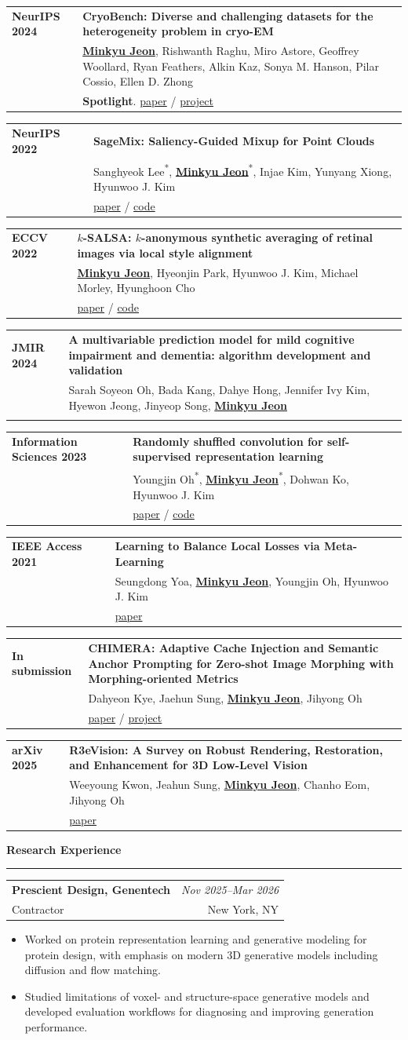 \documentclass[10pt,letterpaper]{article}
\makeatletter
\newcommand{\minkyu}{\underline{\textbf{Minkyu Jeon}}}
\newcommand{\cofirst}{\textsuperscript{*}}
\newcommand{\cvsection}[1]{%
  \vspace{8pt}
  {\large\bfseries\color{accent} #1}\par
  \vspace{2pt}\hrule\vspace{5pt}
}
\newcommand{\entry}[4]{%
  \begin{tabularx}{\textwidth}{@{}>{\raggedright\arraybackslash}X r@{}}
    \textbf{#1} & \textit{#2}\\
    #3 & #4
  \end{tabularx}\vspace{2pt}
}
\newcommand{\paper}[4]{%
  \begin{tabularx}{\textwidth}{@{}p{2.45cm}>{\raggedright\arraybackslash}X@{}}
    \textbf{#1} & \textbf{#2}\\
    & #3\\
    & {\small #4}
  \end{tabularx}\vspace{4pt}
}
\newcommand{\compactitem}[1]{\begin{itemize}#1\end{itemize}\vspace{1pt}}
\makeatother
\begin{document}
\paper{NeurIPS 2024}{CryoBench: Diverse and challenging datasets for the heterogeneity problem in cryo-EM}
{\minkyu, Rishwanth Raghu, Miro Astore, Geoffrey Woollard, Ryan Feathers, Alkin Kaz, Sonya M. Hanson, Pilar Cossio, Ellen D. Zhong}
{\textbf{Spotlight}. \href{https://arxiv.org/pdf/2408.05526}{paper} / \href{https://cryobench.cs.princeton.edu/}{project}}

\paper{NeurIPS 2022}{SageMix: Saliency-Guided Mixup for Point Clouds}
{Sanghyeok Lee\cofirst, \minkyu\cofirst, Injae Kim, Yunyang Xiong, Hyunwoo J. Kim}
{\href{https://openreview.net/pdf?id=q-FRENiEP_d}{paper} / \href{https://github.com/mlvlab/SageMix/}{code}}

\paper{ECCV 2022}{$k$-SALSA: $k$-anonymous synthetic averaging of retinal images via local style alignment}
{\minkyu, Hyeonjin Park, Hyunwoo J. Kim, Michael Morley, Hyunghoon Cho}
{\href{https://arxiv.org/pdf/2303.10824}{paper} / \href{https://github.com/hcholab/k-salsa/}{code}}

\paper{JMIR 2024}{A multivariable prediction model for mild cognitive impairment and dementia: algorithm development and validation}
{Sarah Soyeon Oh, Bada Kang, Dahye Hong, Jennifer Ivy Kim, Hyewon Jeong, Jinyeop Song, \minkyu}
{}

\paper{Information Sciences 2023}{Randomly shuffled convolution for self-supervised representation learning}
{Youngjin Oh\cofirst, \minkyu\cofirst, Dohwan Ko, Hyunwoo J. Kim}
{\href{https://www.sciencedirect.com/science/article/pii/S0020025522013032}{paper} / \href{https://github.com/minkyujeon/CROFFLE/tree/main/}{code}}

\paper{IEEE Access 2021}{Learning to Balance Local Losses via Meta-Learning}
{Seungdong Yoa, \minkyu, Youngjin Oh, Hyunwoo J. Kim}
{\href{https://ieeexplore.ieee.org/document/9541196}{paper}}

\paper{In submission}{CHIMERA: Adaptive Cache Injection and Semantic Anchor Prompting for Zero-shot Image Morphing with Morphing-oriented Metrics}
{Dahyeon Kye, Jaehun Sung, \minkyu, Jihyong Oh}
{\href{https://www.arxiv.org/abs/2512.07155}{paper} / \href{https://cmlab-korea.github.io/CHIMERA/}{project}}

\paper{arXiv 2025}{R3eVision: A Survey on Robust Rendering, Restoration, and Enhancement for 3D Low-Level Vision}
{Weeyoung Kwon, Jeahun Sung, \minkyu, Chanho Eom, Jihyong Oh}
{\href{https://arxiv.org/abs/2506.16262}{paper}}

\cvsection{Research Experience}
\entry{Prescient Design, Genentech}{Nov 2025--Mar 2026}{Contractor}{New York, NY}
\compactitem{
  \item Worked on protein representation learning and generative modeling for protein design, with emphasis on modern 3D generative models including diffusion and flow matching.
  \item Studied limitations of voxel- and structure-space generative models and developed evaluation workflows for diagnosing and improving generation performance.
}
\end{document}
